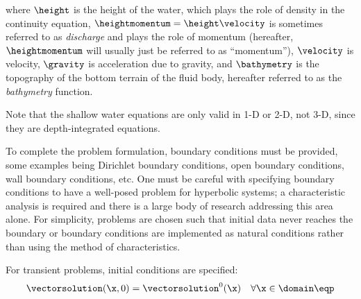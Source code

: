 where $\height$ is the height of the water, which plays the role of density
in the continuity equation, $\heightmomentum=\height\velocity$ is sometimes
referred to as \emph{discharge} and plays the role of momentum (hereafter,
$\heightmomentum$ will usually just be referred to as ``momentum''),
$\velocity$ is velocity, $\gravity$
is acceleration due to gravity, and $\bathymetry$ is the topography of the
bottom terrain of the fluid body, hereafter referred to as the \emph{bathymetry}
function.

Note that the shallow water equations are only valid in 1-D or 2-D, not 3-D,
since they are depth-integrated equations.

To complete the problem formulation, boundary
conditions must be provided, some examples being
Dirichlet boundary conditions, open boundary conditions,
wall boundary conditions,
etc. One must be careful with specifying boundary conditions to have
a well-posed problem for hyperbolic systems; a characteristic analysis
is required and there is a large body of research
addressing this area alone. For simplicity, problems are
chosen such that initial data never reaches the boundary
or boundary conditions are implemented as natural conditions
rather than using the method of characteristics.

For transient problems, initial conditions are specified:
\begin{equation}
   \vectorsolution(\x,0) = \vectorsolution^0(\x)
   \quad \forall \x\in\domain \eqp
\end{equation}
